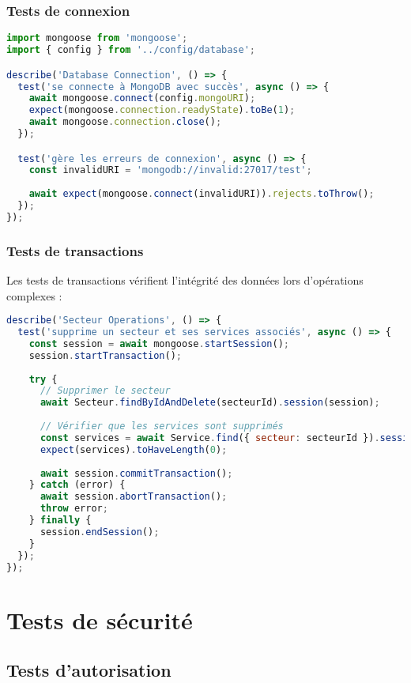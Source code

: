 \subsubsection{Tests de connexion}
\begin{lstlisting}[language=JavaScript, caption=Test de connexion à la base de données]
import mongoose from 'mongoose';
import { config } from '../config/database';

describe('Database Connection', () => {
  test('se connecte à MongoDB avec succès', async () => {
    await mongoose.connect(config.mongoURI);
    expect(mongoose.connection.readyState).toBe(1);
    await mongoose.connection.close();
  });

  test('gère les erreurs de connexion', async () => {
    const invalidURI = 'mongodb://invalid:27017/test';
    
    await expect(mongoose.connect(invalidURI)).rejects.toThrow();
  });
});
\end{lstlisting}

\subsubsection{Tests de transactions}
Les tests de transactions vérifient l'intégrité des données lors d'opérations complexes :

\begin{lstlisting}[language=JavaScript, caption=Test de transaction]
describe('Secteur Operations', () => {
  test('supprime un secteur et ses services associés', async () => {
    const session = await mongoose.startSession();
    session.startTransaction();
    
    try {
      // Supprimer le secteur
      await Secteur.findByIdAndDelete(secteurId).session(session);
      
      // Vérifier que les services sont supprimés
      const services = await Service.find({ secteur: secteurId }).session(session);
      expect(services).toHaveLength(0);
      
      await session.commitTransaction();
    } catch (error) {
      await session.abortTransaction();
      throw error;
    } finally {
      session.endSession();
    }
  });
});
\end{lstlisting}

\section{Tests de sécurité}
\subsection{Tests d'autorisation}
